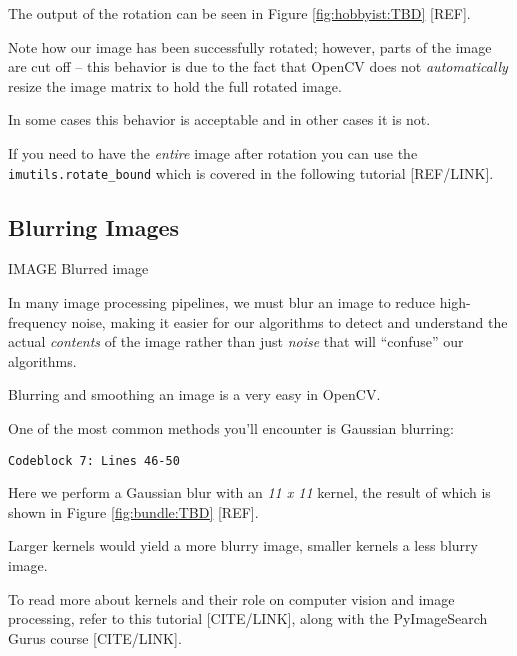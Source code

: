 The output of the rotation can be seen in Figure \ref{fig:hobbyist:TBD} [REF].

Note how our image has been successfully rotated; however, parts of the image are cut off -- this behavior is due to the fact that OpenCV does not \textit{automatically} resize the image matrix to hold the full rotated image.

In some cases this behavior is acceptable and in other cases it is not.

If you need to have the \textit{entire} image after rotation you can use the \texttt{imutils.rotate_bound} which is covered in the following tutorial [REF/LINK].


\subsection{Blurring Images}

IMAGE Blurred image

In many image processing pipelines, we must blur an image to reduce high-frequency noise, making it easier for our algorithms to detect and understand the actual \textit{contents} of the image rather than just \textit{noise} that will “confuse” our algorithms.

Blurring and smoothing an image is a very easy in OpenCV.

One of the most common methods you’ll encounter is Gaussian blurring:

\begin{verbatim}
Codeblock 7: Lines 46-50
\end{verbatim}

Here we perform a Gaussian blur with an \textit{11 x 11} kernel, the result of which is shown in Figure \ref{fig:bundle:TBD} [REF].

Larger kernels would yield a more blurry image, smaller kernels a less blurry image.

To read more about kernels and their role on computer vision and image processing, refer to this tutorial [CITE/LINK], along with the PyImageSearch Gurus course [CITE/LINK].


